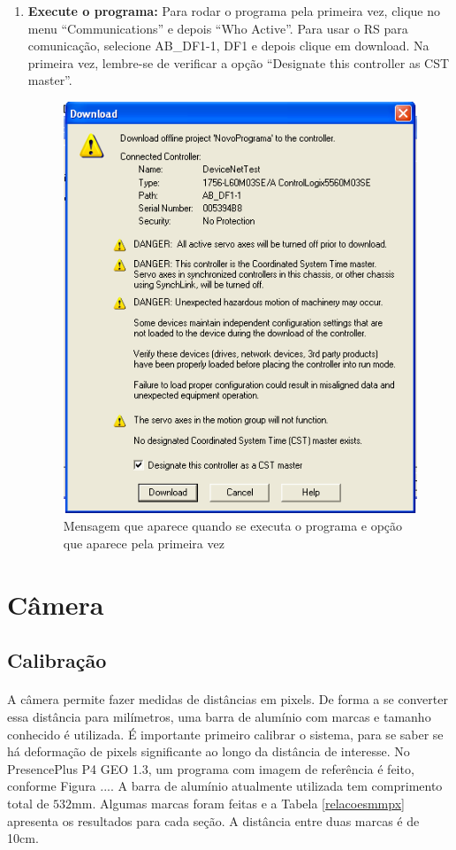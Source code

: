 \documentclass[a4paper,11pt]{scrartcl} %
\numberwithin{equation}{section} %
\numberwithin{figure}{section} %
\numberwithin{table}{section} %
\begin{document}
\begin{enumerate}
     \item \textbf{Execute o programa: } Para rodar o programa pela primeira vez, clique no menu ``Communications'' e depois ``Who Active''. Para usar o RS para comunicação, selecione AB\_DF1-1, DF1 e depois clique em download. Na primeira vez, lembre-se de verificar a opção ``Designate this controller as CST master''.
	
	\begin{figure}[H]
       \centering
              \includegraphics[width=0.9\linewidth]{figures/software/step23}
              \caption{Mensagem que aparece quando se executa o programa e opção que aparece pela primeira vez\label{mensagemRodar}}
          \end{figure}
\end{enumerate}

\section{Câmera}
\subsection{Calibração}
\paragraph{} A câmera permite fazer medidas de distâncias em pixels. De forma a se converter essa distância para milímetros, uma barra de alumínio com marcas e tamanho conhecido é utilizada. É importante primeiro calibrar o sistema, para se saber se há deformação de pixels significante ao longo da distância de interesse. No PresencePlus P4 GEO 1.3, um programa com imagem de referência é feito, conforme Figura .... A barra de alumínio atualmente utilizada tem comprimento total de $532$mm. Algumas marcas foram feitas e a Tabela \ref{relacoesmmpx} apresenta os resultados para cada seção. A distância entre duas marcas é de 10cm.
\end{document}
